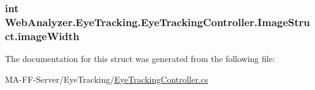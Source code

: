 \subsubsection[{image\+Width}]{\setlength{\rightskip}{0pt plus 5cm}int Web\+Analyzer.\+Eye\+Tracking.\+Eye\+Tracking\+Controller.\+Image\+Struct.\+image\+Width}\label{struct_web_analyzer_1_1_eye_tracking_1_1_eye_tracking_controller_1_1_image_struct_ab4cbe360570340ca7b6dbe0e922c8e9b}


The documentation for this struct was generated from the following file\+:\begin{DoxyCompactItemize}
\item 
M\+A-\/\+F\+F-\/\+Server/\+Eye\+Tracking/\hyperlink{_eye_tracking_controller_8cs}{Eye\+Tracking\+Controller.\+cs}\end{DoxyCompactItemize}
